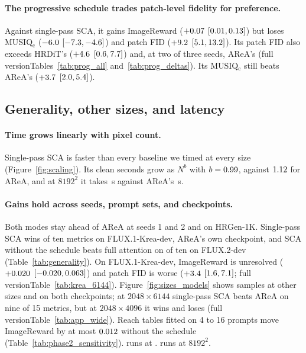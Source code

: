\documentclass{article} %
\newif\ifresfluxtwo \resfluxtwofalse
\newif\ifresqwen    \resqwenfalse
\newif\ifresideogram \resideogramfalse
\newif\ifshowcase
\newcommand{\fullonly}[1]{\ifshortversion\else#1\fi}
\newcommand{\shortalt}[2]{\ifshortversion#2\else#1\fi}
\newcommand{\ideogramRefs}{\IfFileExists{figures/snippets/ideogram4.tex}{Table~\ref{tab:ideogram4}\IfFileExists{figures/snippets/ideogram4_fig.tex}{, Figure~\ref{fig:ideogram4}}{}}{\IfFileExists{figures/snippets/ideogram4_fig.tex}{Figure~\ref{fig:ideogram4}}{Appendix~\ref{app:newer}}}}
\DeclareRobustCommand{\pend}[1]{{\leavevmode\color{pendgrey}\def\up##1{##1}\def\dn##1{##1}#1}}
\providecommand{\hlWideSixWins}{\pend{nine of 15}}
\newcommand{\sca}{SCA}
\newcommand{\up}[1]{\textcolor{sigup}{#1}}
\newcommand{\dn}[1]{\textcolor{sigdn}{#1}}
\theoremstyle{remark}
\begin{document}
\paragraph{The progressive schedule trades patch-level fidelity for preference.} Against single-pass \sca{}, it gains ImageReward ($+0.07$ $[0.01,0.13]$) but loses MUSIQ$_\text{c}$ ($-6.0$ $[-7.3,-4.6]$) and patch FID ($+9.2$ $[5.1,13.2]$). Its patch FID also exceeds HRDiT's ($+4.6$ $[0.6,7.7]$) and, at two of three seeds, AReA's (\shortalt{Tables~\ref{tab:prog_all} and~\ref{tab:prog_deltas}}{full version}). Its MUSIQ$_\text{c}$ still beats AReA's ($+3.7$ $[2.0,5.4]$).

\subsection{Generality, other sizes, and latency}
\label{sec:generality}\label{sec:sizes}

\paragraph{Time grows linearly with pixel count.} Single-pass \sca{} is faster than every baseline we timed at every size (Figure~\ref{fig:scaling}). Its clean seconds grow as $N^b$ with $b=0.99$, against $1.12$ for AReA, and at $8192^2$ it takes \hlLatEightSca\,s against AReA's \hlLatEightArea\,s.

\paragraph{Gains hold across seeds, prompt sets, and checkpoints.} Both modes stay ahead of AReA at seeds 1 and 2 and on HRGen-1K. Single-pass \sca{} wins \hlKreaWinsWord{} of ten metrics on FLUX.1-Krea-dev, AReA's own checkpoint, and \sca{} without the schedule beats full attention on \hlFluxTwoWinsWord{} of ten on FLUX.2-dev\ifresfluxtwo{} (Figure~\ref{fig:showcase_flux2})\fi{} (Table~\ref{tab:generality}). On FLUX.1-Krea-dev, ImageReward is unresolved ($+0.020$ $[-0.020,0.063]$) and patch FID is worse ($+3.4$ $[1.6,7.1]$; \shortalt{Table~\ref{tab:krea_6144}}{full version}). Figure~\ref{fig:sizes_models} shows samples at other sizes and on both checkpoints; at $2048\times6144$ single-pass \sca{} beats AReA on \hlWideSixWins{} metrics, but at $2048\times4096$ it wins \hlWideFourWinsWord{} and loses \hlWideFourLossesWord{} (\shortalt{Table~\ref{tab:app_wide}}{full version}). Reach tables fitted on 4 to 16 prompts move ImageReward by at most $0.012$ without the schedule\fullonly{ (Table~\ref{tab:phase2_sensitivity})}.\ifresfluxtwo\ifdefined\fluxTwoResult{} \fluxTwoResult\fi\fi{} \ifresqwen\textbf{Qwen-Image (Figure~\ref{fig:showcase_qwen}).} \ifdefined\qwenResult\qwenResult\else\sca{} runs at \showcaseQwenSizes.\fi{} \fi\ifresideogram\textbf{Ideogram~4 (\ideogramRefs).} \ifdefined\ideogramResult\ideogramResult\else\sca{} runs at $8192^2$.\fi{} \fi\ifshowcase Figure~\ref{fig:showcase_models} shows samples on FLUX.2-dev and Qwen-Image. \fi
\end{document}
